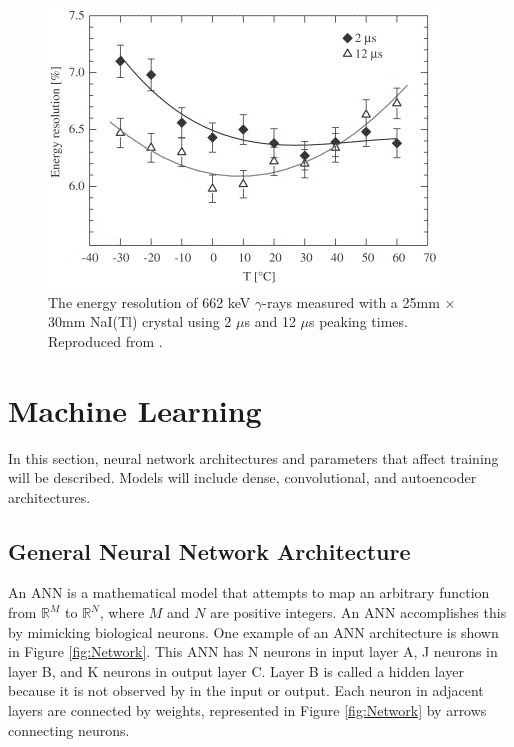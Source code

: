 \begin{figure}[H]
\centering
\includegraphics[width=0.95\linewidth]{images/temp-dependence-resolution-moszynski}
\caption{The energy resolution of 662 keV $\gamma$-rays measured with a 25mm × 30mm NaI(Tl) crystal using 2 $\mu$s and 12 $\mu$s peaking times. Reproduced from \cite{MOSZYNSKI2006739}.}


\label{fig:temp-dependence-resolution-moszynski}
\end{figure}

\section{Machine Learning}

In this section, neural network architectures and parameters that affect training will be described. Models will include dense, convolutional, and autoencoder architectures. 

\subsection{General Neural Network Architecture}

An \acrlong{ANN} is a mathematical model that attempts to map an arbitrary function from $\mathbb{R}^M$ to $\mathbb{R}^N$, where $M$ and $N$ are positive integers. An ANN accomplishes this by mimicking biological neurons. One example of an ANN architecture is shown in Figure \ref{fig:Network}. This ANN has N neurons in input layer A, J neurons in layer B, and K neurons in output layer C. Layer B is called a hidden layer because it is not observed by in the input or output. Each neuron in adjacent layers are connected by weights, represented in Figure \ref{fig:Network} by arrows connecting neurons. 




